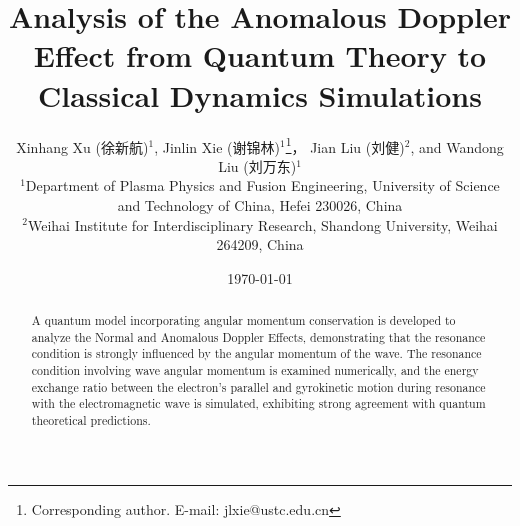 \documentclass{cpbtex3}
\begin{document}
\title{Analysis of the Anomalous Doppler Effect from Quantum Theory to Classical Dynamics Simulations}



\author{
Xinhang Xu (徐新航)$^{1}$, 
Jinlin Xie (谢锦林)$^{1}$\thanks{Corresponding author. E-mail: jlxie@ustc.edu.cn}，
Jian Liu (刘健)$^{2}$, 
and Wandong Liu (刘万东)$^{1}$\\
$^{1}$Department of Plasma Physics and Fusion Engineering, University of Science and Technology of China, Hefei 230026, China \\
$^{2}$Weihai Institute for Interdisciplinary Research, Shandong University, Weihai 264209, China
}

\date{\today}
\maketitle

\begin{abstract}
A quantum model incorporating angular momentum conservation is developed to analyze the Normal and Anomalous Doppler Effects, demonstrating that the resonance condition is strongly influenced by the angular momentum of the wave. The resonance condition involving wave angular momentum is examined numerically, and the energy exchange ratio between the electron's parallel and gyrokinetic motion during resonance with the electromagnetic wave is simulated, exhibiting strong agreement with quantum theoretical predictions.
\end{abstract}
\end{document}
